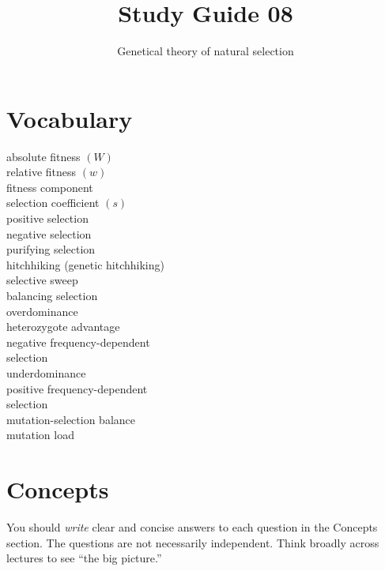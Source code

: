 \documentclass[letterpaper]{tufte-handout}
\title{Study Guide 08\hfill}
\author{Genetical theory of natural selection}
\date{} %
\begin{document}
\maketitle	%

\section{Vocabulary}

\begin{multicols}{2}
absolute fitness $\left(W\right)$ \\
relative fitness $\left(w\right)$ \\
fitness component \\
selection coefficient $\left(s\right)$\\
positive selection \\
negative selection \\
purifying selection \\
hitchhiking (genetic hitchhiking) \\
selective sweep \\
balancing selection \\
overdominance \\
heterozygote advantage \\
negative frequency-dependent \\
  \quad selection\\
underdominance \\
positive frequency-dependent \\
  \quad selection \\
mutation-selection balance \\
mutation load
\end{multicols}


\section{Concepts}

You should \emph{write} clear and concise answers to each question in the Concepts section.  The questions are not necessarily independent.  Think broadly across lectures to see ``the big picture.'' 
\end{document}
